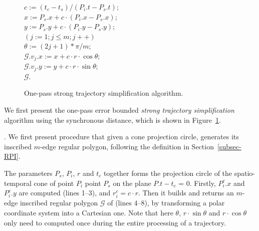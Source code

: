 \begin{figure}[tb!]
\begin{center}
{\begin{minipage}{3.36in}
{%
	\bcc \hspace{1ex} $c := (t_c-t_s)/(P_i.t - P_s.t)$; \\
	\icc \hspace{1ex} $x := P_s.x + c\cdot(P_i.x-P_s.x)$; \\
	\icc \hspace{1ex} $y := P_s.y + c\cdot(P_i.y-P_s.y)$; \\
	\icc \hspace{1ex} \For $(j := 1;j \le m;j++)$ \Do \\
	\icc \> \hspace{2ex} $\theta :=  (2j + 1)*\pi /m $; \\
	\icc \> \hspace{2ex} $\mathcal{G}.v_j.x := x + c\cdot r\cdot\cos\theta$;\\
	\icc \> \hspace{2ex} $\mathcal{G}.v_j.y := y + c\cdot r\cdot\sin\theta$;\\
	\icc \hspace{1ex} \Return $\mathcal{G}$.
}
\vspace{-2ex}
\myhrule
\end{minipage}
}
\end{center}
\vspace{-2ex}
\caption{\small One-pass strong trajectory  simplification algorithm.}
\label{alg:CI3d}
\vspace{-3ex}
\end{figure}


 We first present the  one-pass error bounded {\em strong trajectory simplification} algorithm using the synchronous distance, which is shown in Figure~\ref{alg:CI3d}.

.
We first present procedure  that given a cone projection circle, generates its inscribed $m$-edge regular polygon,  following the definition in Section~\ref{subsec-RPI}.

The parameters $P_s$, $P_i$, $r$ and $t_c$ together forms the projection circle  of the spatio-temporal cone  of point $P_{i}$ \wrt point $P_s$ on the plane $P.t - t_c$ = $0$. Firstly, $P^c_i.x$ and $P^c_i.y$ are computed (lines 1--3), and $r^c_i = c\cdot r$.
Then it builds and returns an $m$-edge inscribed regular polygon $\mathcal{G}$ of  (lines 4--8), by transforming a polar coordinate system
into a Cartesian one. Note that here $\theta$, $r\cdot\sin\theta$ and $r\cdot\cos\theta$ only need to computed once during the entire processing of a trajectory.

